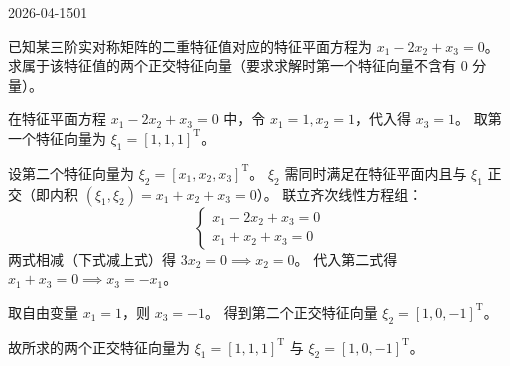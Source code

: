 \begin{mistake}{2026-04-15}{01}

\begin{problemcontent}
已知某三阶实对称矩阵的二重特征值对应的特征平面方程为 \(x_1 - 2x_2 + x_3 = 0\)。求属于该特征值的两个正交特征向量（要求求解时第一个特征向量不含有 0 分量）。
\end{problemcontent}

\begin{solutioncontent}
在特征平面方程 \(x_1 - 2x_2 + x_3 = 0\) 中，令 \(x_1=1, x_2=1\)，代入得 \(x_3=1\)。
取第一个特征向量为 \(\xi_1 = [1, 1, 1]^{\mathrm{T}}\)。

设第二个特征向量为 \(\xi_2 = [x_1, x_2, x_3]^{\mathrm{T}}\)。
\(\xi_2\) 需同时满足在特征平面内且与 \(\xi_1\) 正交（即内积 \((\xi_1, \xi_2) = x_1 + x_2 + x_3 = 0\)）。
联立齐次线性方程组：
\[
\begin{cases}
x_1 - 2x_2 + x_3 = 0 \\
x_1 + x_2 + x_3 = 0
\end{cases}
\]
两式相减（下式减上式）得 \(3x_2 = 0 \implies x_2 = 0\)。
代入第二式得 \(x_1 + x_3 = 0 \implies x_3 = -x_1\)。

取自由变量 \(x_1 = 1\)，则 \(x_3 = -1\)。
得到第二个正交特征向量 \(\xi_2 = [1, 0, -1]^{\mathrm{T}}\)。

故所求的两个正交特征向量为 \(\xi_1 = [1, 1, 1]^{\mathrm{T}}\) 与 \(\xi_2 = [1, 0, -1]^{\mathrm{T}}\)。
\end{solutioncontent}


\end{mistake}
